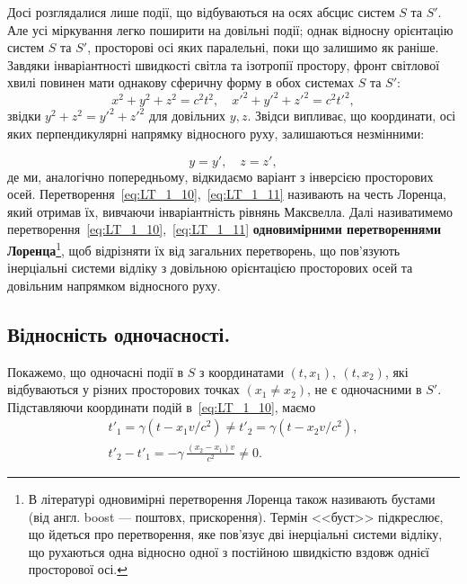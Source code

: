 Досі розглядалися лише події, що відбуваються на осях абсцис систем $S$ та $S'$. Але усі міркування легко поширити на
довільні події; однак відносну орієнтацію систем $S$ та $S'$, просторові осі яких паралельні, поки що залишимо як
раніше. Завдяки інваріантності швидкості світла та ізотропії простору, фронт світлової хвилі повинен мати однакову
сферичну форму в обох системах $S$ та $S'$:
\begin{equation*}
    x^2+y^2+z^2=c^2t^2, \quad x'^2+y'^2+z'^2=c^2t'^2,
\end{equation*}
звідки $y^2+z^2=y'^2+z'^2$ для довільних $y,z$. Звідси випливає, що координати, осі яких перпендикулярні напрямку
відносного руху, залишаються незмінними:

\begin{equation}\label{eq:LT_1_11a}
	y=y', \quad z=z',
\end{equation}
%
де ми, аналогічно попередньому, відкидаємо варіант з інверсією просторових осей.
Перетворення~\eqref{eq:LT_1_10},~\eqref{eq:LT_1_11} називають на честь Лоренца, який отримав їх, вивчаючи інваріантність
рівнянь Максвелла. Далі називатимемо перетворення~\eqref{eq:LT_1_10},~\eqref{eq:LT_1_11} \textbf{одновимірними
перетвореннями Лоренца}\footnote{В літературі одновимірні перетворення Лоренца також називають бустами (від англ. boost
--- поштовх, прискорення). Термін <<буст>> підкреслює, що йдеться про перетворення, яке пов'язує дві інерціальні системи
відліку, що рухаються одна відносно одної з постійною швидкістю вздовж однієї просторової осі.}, щоб відрізняти їх від
загальних перетворень, що пов'язують інерціальні системи відліку з довільною орієнтацією просторових осей та довільним
напрямком відносного руху.

\subsection*{Відносність одночасності.}

Покажемо, що одночасні події в $S$ з координатами $(t,x_1),\ (t,x_2)$, які відбуваються у різних просторових точках
$\left(x_1\ne x_2\right)$, не є одночасними в $S'$. Підставляючи координати подій в~\eqref{eq:LT_1_10}, маємо
\begin{align*}
   t'_1 =\gamma (t-x_1v/c^2)\neq t'_2=\gamma (t-x_2v/c^2), \\
   t'_2 - t'_1 = -\gamma\,\frac{(x_2-x_1)v}{c^2} \neq 0.
\end{align*}

